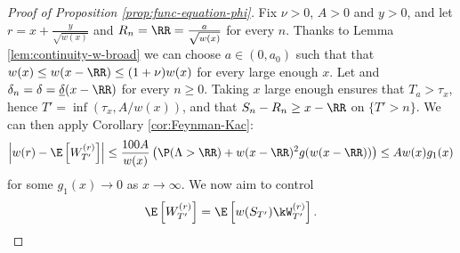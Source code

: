 \documentclass[10pt,a4paper]{article}
\begin{document}
\begin{proof}[Proof of Proposition \ref{prop:func-equation-phi}]
Fix $\nu>0$, $A>0$ and $y>0$, and let $r = x + \frac{y}{\sqrt{w(x)}}$ and $R_n = \RR = \frac{a}{\sqrt{w(x)}}$ for every $n$. Thanks to Lemma \ref{lem:continuity-w-broad} we can choose $a \in(0,a_0)$ such that that $w(x) \leq w(x-\RR) \leq (1+\nu) w(x)$ for every large enough $x$. 
Let and $\delta_n = \delta = \underline{\delta}(x-\RR)$ for every $n\geq 0$. Taking $x$ large enough ensures that $T_a > \tau_x$, hence $T' = \inf(\tau_x, A/w(x))$, and that $S_n-R_n \geq x-\RR$ on $\{T'>n\}$. 
We can then apply Corollary \ref{cor:Feynman-Kac}:
\[ \left| w(r) - \E\left[ W^{(r)}_{T'}\right] \right| \leq \frac{100 A}{w(x)}\left(\P(\Lambda>\RR) + w(x-\RR)^2 g(w(x-\RR))\right) \leq A w(x) g_1(x) \]
for some $g_1(x) \to 0$ as $x\to \infty$. 
We now aim to control 
\[ \E\left[ W^{(r)}_{T'}\right] = \E\left[ w(S_{T'}) \kW^{(r)}_{T'} \right] . \] 



\end{proof}
\end{document}
